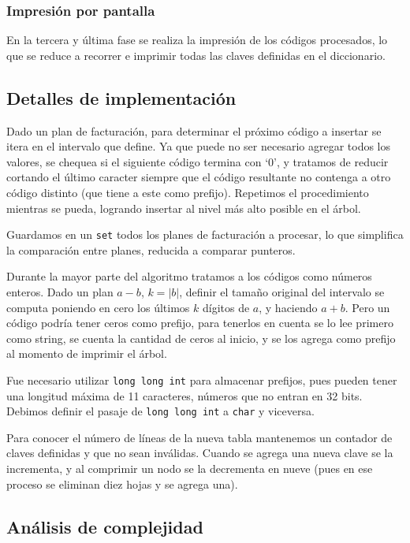 \subsubsection*{Impresión por pantalla}

En la tercera y última fase se realiza la impresión de los códigos procesados,
lo que se reduce a recorrer e imprimir todas las claves definidas en el
diccionario.

\subsection*{Detalles de implementación}

Dado un plan de facturación, para determinar el próximo código a insertar se
itera en el intervalo que define. Ya que puede no ser necesario agregar todos
los valores, se chequea si el siguiente código termina con `0', y tratamos
de reducir cortando el último caracter siempre que el código resultante no
contenga a otro código distinto (que tiene a este como prefijo). Repetimos el
procedimiento mientras se pueda, logrando insertar al nivel más alto posible en
el árbol.

Guardamos en un {\tt set} todos los planes de facturación a procesar, lo que
simplifica la comparación entre planes, reducida a comparar punteros.

Durante la mayor parte del algoritmo tratamos a los códigos como números
enteros. Dado un plan $a-b$, $k=|b|$, definir el tamaño original del
intervalo se computa poniendo en cero los últimos $k$ dígitos de $a$,
y haciendo $a+b$. Pero un código podría tener ceros como prefijo, para
tenerlos en cuenta se lo lee primero como string, se cuenta la cantidad de
ceros al inicio, y se los agrega como prefijo al momento de imprimir el árbol.

Fue necesario utilizar {\tt long long int} para almacenar prefijos,
pues pueden tener una longitud máxima de 11 caracteres, números que no
entran en 32 bits. Debimos definir el pasaje de {\tt long long int} a {\tt char}
y viceversa.

Para conocer el número de líneas de la nueva tabla mantenemos un contador
de claves definidas y que no sean inválidas. Cuando se agrega una nueva
clave se la incrementa, y al comprimir un nodo se la decrementa en nueve
(pues en ese proceso se eliminan diez hojas y se agrega una).

\subsection*{Análisis de complejidad}

